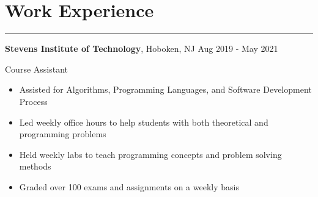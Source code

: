\documentclass[10pt]{article}
\newcommand{\resumesection}[1]{\vspace{-0.2cm}\section*{#1}\vspace{-0.2cm}\hrule\vspace{0.2cm}}
\begin{document}




\resumesection{Work Experience}

\textbf{Stevens Institute of Technology}, Hoboken, NJ \hfill Aug 2019 - May 2021\par
Course Assistant
\begin{itemize}
	\item Assisted for Algorithms, Programming Languages, and Software Development Process
	\item Led weekly office hours to help students with both theoretical and programming problems
	\item Held weekly labs to teach programming concepts and problem solving methods
	\item Graded over 100 exams and assignments on a weekly basis
\end{itemize}
\end{document}
